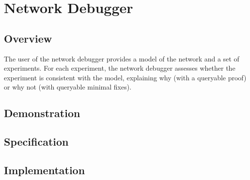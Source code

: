 \section{Network Debugger}
\subsection{Overview}
The user of the network debugger provides a model of the network and a
set of experiments. For each experiment, the network debugger assesses
whether the experiment is consistent with the model, explaining why
(with a queryable proof) or why not (with queryable minimal fixes).
\subsection{Demonstration}
\subsection{Specification}
\subsection{Implementation}
